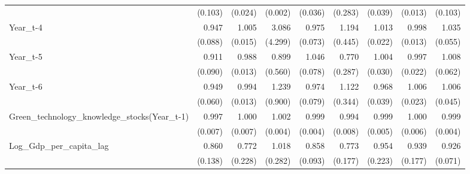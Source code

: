 \begin{table}[htbp]
\begin{tabular}{l*{8}{D{.}{.}{-1}}}
                    &     (0.103)         &     (0.024)         &     (0.002)         &     (0.036)         &     (0.283)         &     (0.039)         &     (0.013)         &     (0.103)         \\
Year\_t-4            &       0.947         &       1.005         &       3.086         &       0.975         &       1.194         &       1.013         &       0.998         &       1.035         \\
                    &     (0.088)         &     (0.015)         &     (4.299)         &     (0.073)         &     (0.445)         &     (0.022)         &     (0.013)         &     (0.055)         \\
Year\_t-5            &       0.911         &       0.988         &       0.899         &       1.046         &       0.770         &       1.004         &       0.997         &       1.008         \\
                    &     (0.090)         &     (0.013)         &     (0.560)         &     (0.078)         &     (0.287)         &     (0.030)         &     (0.022)         &     (0.062)         \\
Year\_t-6            &       0.949         &       0.994         &       1.239         &       0.974         &       1.122         &       0.968         &       1.006         &       1.006         \\
                    &     (0.060)         &     (0.013)         &     (0.900)         &     (0.079)         &     (0.344)         &     (0.039)         &     (0.023)         &     (0.045)         \\
Green\_technology\_knowledge\_stocks(Year\_t-1)&       0.997         &       1.000         &       1.002         &       0.999         &       0.994         &       0.999         &       1.000         &       0.999         \\
                    &     (0.007)         &     (0.007)         &     (0.004)         &     (0.004)         &     (0.008)         &     (0.005)         &     (0.006)         &     (0.004)         \\
Log\_Gdp\_per\_capita\_lag&       0.860         &       0.772         &       1.018         &       0.858         &       0.773         &       0.954         &       0.939         &       0.926         \\
                    &     (0.138)         &     (0.228)         &     (0.282)         &     (0.093)         &     (0.177)         &     (0.223)         &     (0.177)         &     (0.071)         \\

\end{tabular}
\end{table}

